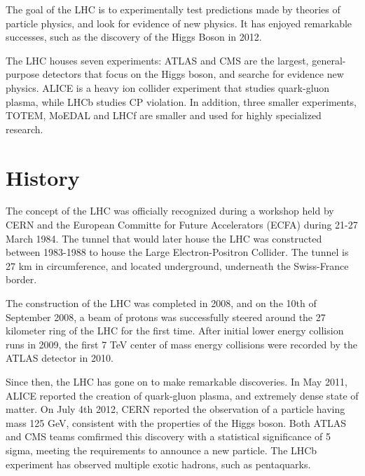 \documentclass[11pt,a4paper,openright,twoside]{report}
\begin{document}
The goal of the LHC is to experimentally test predictions made by theories of particle physics, and look for evidence of new physics. It has enjoyed remarkable successes, such as the discovery of the Higgs Boson in 2012.

The LHC houses seven experiments: ATLAS and CMS are the largest, general-purpose detectors that focus on the Higgs boson, and searche for evidence new physics. ALICE is a heavy ion collider experiment that studies quark-gluon plasma, while LHCb studies CP violation. In addition, three smaller experiments, TOTEM, MoEDAL and LHCf are smaller and used for highly specialized research.

\section{History}
The concept of the LHC was officially recognized during a workshop held by CERN and the European Committe for Future Accelerators (ECFA) during 21-27 March 1984. The tunnel that would later house the LHC was constructed between 1983-1988 to house the Large Electron-Positron Collider. The tunnel is 27 km in circumference, and located underground, underneath the Swiss-France border.

The construction of the LHC was completed in 2008, and on the 10th of September 2008, a beam of protons was successfully steered around the 27 kilometer ring of the LHC for the first time. After initial lower energy collision runs in 2009, the first 7 TeV center of mass energy collisions were recorded by the ATLAS detector in 2010.

Since then, the LHC has gone on to make remarkable discoveries. In May 2011, ALICE reported the creation of quark-gluon plasma, and extremely dense state of matter. On July 4th 2012, CERN reported the observation of a particle having mass 125 GeV, consistent with the properties of the Higgs boson. Both ATLAS and CMS teams comfirmed this discovery with a statistical significance of 5 sigma, meeting the requirements to announce a new particle. The LHCb experiment has observed multiple exotic hadrons, such as pentaquarks.
\vfill
\end{document}
